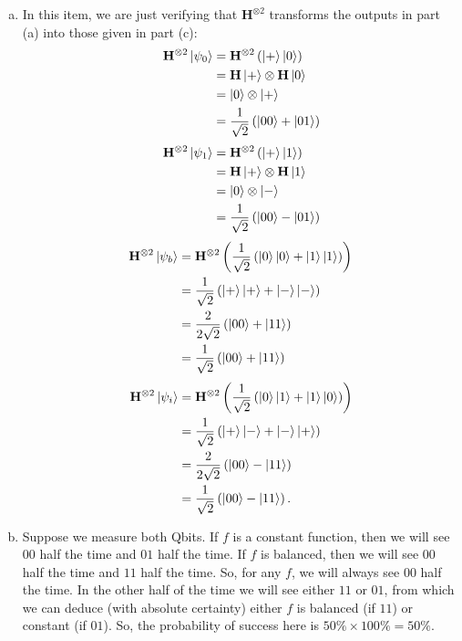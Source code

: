 \documentclass{book}
\theoremstyle{definition}
\newcommand{\nn}{\nonumber}
\newcommand{\f}[2]{\frac{#1}{#2}}
\newcommand{\lp}{\left(}
\newcommand{\rp}{\right)}
\newcommand{\had}{\mathbf{H}}
\begin{document}
\begin{enumerate}[(a)]
	
	
	
	
	\item In this item, we are just verifying that $\had^{\otimes 2}$ transforms the outputs in part (a) into those given in part (c):
	\begin{align}
	\had^{\otimes 2}\ket{\psi_0} &= \had^{\otimes 2} \lp \ket{+}\ket{0}\rp\nn\\
	&= \had\ket{+} \otimes \had\ket{0}\nn\\
	&= \ket{0} \otimes \ket{+}\nn\\
	&= \f{1}{\sqrt{2}}   \lp \ket{00} + \ket{01}  \rp
	\end{align}
	\begin{align}
	\had^{\otimes 2}\ket{\psi_1} &= \had^{\otimes 2} \lp \ket{+}\ket{1}\rp \nn\\
	&= \had\ket{+}\otimes \had\ket{1}\nn\\
	&= \ket{0}\otimes \ket{-}\nn\\
	&= \f{1}{\sqrt{2}} \lp \ket{00} - \ket{01}  \rp
	\end{align}
	\begin{align}
	\had^{\otimes 2}\ket{\psi_b} &= \had^{\otimes 2} \lp \f{1}{\sqrt{2}}\lp \ket{0}\ket{0} + \ket{1}\ket{1} \rp\rp\nn\\
	&= \f{1}{\sqrt{2}}\lp \ket{+}\ket{+} + \ket{-}\ket{-} \rp\nn\\
	&= \f{2}{2\sqrt{2}}\lp \ket{00} + \ket{11} \rp\nn\\
	&= \f{1}{\sqrt{2}}\lp \ket{00} + \ket{11} \rp
	\end{align}
	\begin{align}
	\had^{\otimes 2}\ket{\psi_i} &= \had^{\otimes 2} \lp \f{1}{\sqrt{2}}\lp \ket{0}\ket{1} + \ket{1}\ket{0} \rp\rp\nn\\
	&= \f{1}{\sqrt{2}}\lp \ket{+}\ket{-} + \ket{-}\ket{+} \rp\nn\\
	&= \f{2}{2\sqrt{2}}\lp \ket{00} - \ket{11}   \rp \nn\\
	&= \f{1}{\sqrt{2}}\lp \ket{00} - \ket{11} \rp.
	\end{align}
	
	
	\item Suppose we measure both Qbits. If $f$ is a constant function, then we will see $00$ half the time and $01$ half the time. If $f$ is balanced, then we will see $00$ half the time and $11$ half the time. So, for any $f$, we will always see $00$ half the time. In the other half of the time we will see either $11$ or $01$, from which we can deduce (with absolute certainty) either $f$ is balanced (if $11$) or constant (if $01$). So, the probability of success here is $50\% \times 100\% = 50\%$. 
	

\end{enumerate}
\end{document}
